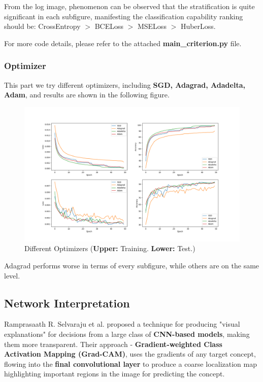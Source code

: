 \documentclass[a4paper, 11pt]{article} %
\begin{document}
From the log image, phenomenon can be observed that the stratification is quite significant
in each subfigure, manifesting the classification capability ranking should be: CrossEntropy
$>$ BCELoss $>$ MSELoss $>$ HuberLoss.

For more code details, please refer to the attached \textbf{main\_criterion.py} file.

\subsubsection{\textbf{Optimizer}}

This part we try different optimizers, including \textbf{SGD, Adagrad, Adadelta, Adam}, and
results are shown in the following figure.

\begin{figure}[H]
	\centering
	\includegraphics[width=1.0\textwidth]{./img/optimizer.png}
	\caption{Different Optimizers (\textbf{Upper:} Training. \textbf{Lower:} Test.)}
\end{figure}

Adagrad performs worse in terms of every subfigure, while others are on the same level.

\subsection{\textbf{Network Interpretation}}

Ramprasaath R. Selvaraju et al. proposed a technique for producing "visual explanations"
for decisions from a large class of \textbf{CNN-based models}, making them more transparent.
Their approach - \textbf{Gradient-weighted Class Activation Mapping (Grad-CAM)}, uses the
gradients of any target concept, flowing into the \textbf{final convolutional layer} to
produce a coarse localization map highlighting important regions in the image for predicting
the concept.
\end{document}
